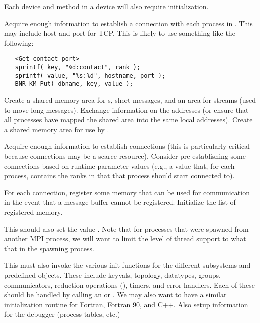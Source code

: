 \documentclass{article}
\begin{document}
\begin{adi3}
Each device and method in a device will also require initialization.  
\begin{tcp}
Acquire enough information to establish a connection with each process
in .  This may include host and port for
TCP.  This is likely to use something like the following:
\begin{verbatim}
   <Get contact port>
   sprintf( key, "%d:contact", rank );
   sprintf( value, "%s:%d", hostname, port );
   BNR_KM_Put( dbname, key, value );
\end{verbatim}
\end{tcp}
\begin{shmem}
Create a shared memory area for s, short
messages, and an area for streams (used to move long messages).
Exchange information on the addresses (or ensure that all 
processes have mapped the shared area into the same local addresses).
Create a shared memory area for use by .
\end{shmem}
\begin{via}
Acquire enough information to establish connections (this is
particularly critical because connections may be a scarce resource).  
Consider pre-establishing some connections based on runtime parameter
values (e.g., a  value that, for each
process, contains the ranks in  that that
process should start connected to).  

For each connection, register some memory that can be used for
communication in the event that a message buffer cannot be registered.
Initialize the list of registered memory.
\end{via}
\end{adi3}
This should also set the value .
Note that for processes that were spawned from another MPI process, we will
want to limit the level of thread support to what that in the spawning
process. 

This must also invoke the various init functions for the different
subsystems and predefined objects.  These include keyvals, topology, datatypes,
groups, communicators, reduction operations (), timers, and error
handlers.  Each of these should be handled by calling an
 or .  We may also
want to have a similar initialization routine for Fortran, Fortran 90,
and C++.  
Also setup information for the debugger (process tables, etc.)
\end{document}
